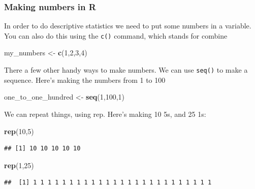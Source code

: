 \documentclass[]{book}
\newenvironment{Shaded}{\begin{snugshade}}{\end{snugshade}}
\newcommand{\KeywordTok}[1]{\textcolor[rgb]{0.13,0.29,0.53}{\textbf{#1}}}
\newcommand{\DecValTok}[1]{\textcolor[rgb]{0.00,0.00,0.81}{#1}}
\newcommand{\StringTok}[1]{\textcolor[rgb]{0.31,0.60,0.02}{#1}}
\newcommand{\NormalTok}[1]{#1}
\begin{document}
\subsubsection{Making numbers in R}\label{making-numbers-in-r}

In order to do descriptive statistics we need to put some numbers in a
variable. You can also do this using the \texttt{c()} command, which
stands for combine

\begin{Shaded}
\begin{Highlighting}[]
\NormalTok{my_numbers <-}\StringTok{ }\KeywordTok{c}\NormalTok{(}\DecValTok{1}\NormalTok{,}\DecValTok{2}\NormalTok{,}\DecValTok{3}\NormalTok{,}\DecValTok{4}\NormalTok{)}
\end{Highlighting}
\end{Shaded}

There a few other handy ways to make numbers. We can use \texttt{seq()}
to make a sequence. Here's making the numbers from 1 to 100

\begin{Shaded}
\begin{Highlighting}[]
\NormalTok{one_to_one_hundred <-}\StringTok{ }\KeywordTok{seq}\NormalTok{(}\DecValTok{1}\NormalTok{,}\DecValTok{100}\NormalTok{,}\DecValTok{1}\NormalTok{)}
\end{Highlighting}
\end{Shaded}

We can repeat things, using rep. Here's making 10 5s, and 25 1s:

\begin{Shaded}
\begin{Highlighting}[]
\KeywordTok{rep}\NormalTok{(}\DecValTok{10}\NormalTok{,}\DecValTok{5}\NormalTok{)}
\end{Highlighting}
\end{Shaded}

\begin{verbatim}
## [1] 10 10 10 10 10
\end{verbatim}

\begin{Shaded}
\begin{Highlighting}[]
\KeywordTok{rep}\NormalTok{(}\DecValTok{1}\NormalTok{,}\DecValTok{25}\NormalTok{)}
\end{Highlighting}
\end{Shaded}

\begin{verbatim}
##  [1] 1 1 1 1 1 1 1 1 1 1 1 1 1 1 1 1 1 1 1 1 1 1 1 1 1
\end{verbatim}
\end{document}
